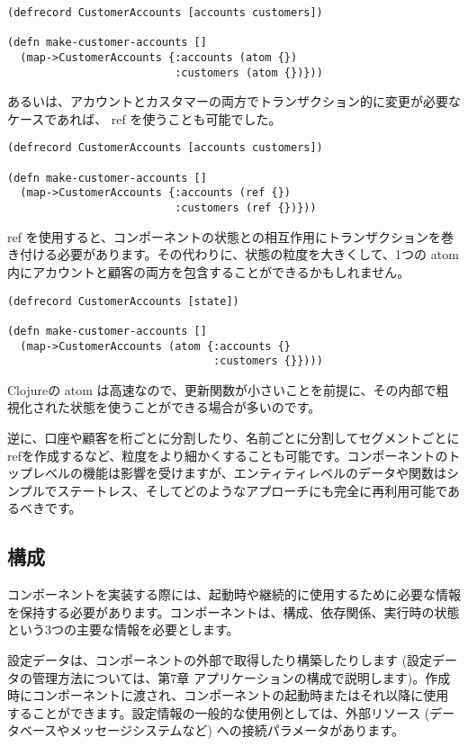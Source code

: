 \begin{lstlisting}[numbers=none]
(defrecord CustomerAccounts [accounts customers])

(defn make-customer-accounts []
  (map->CustomerAccounts {:accounts (atom {})
                          :customers (atom {})}))
\end{lstlisting}

あるいは、アカウントとカスタマーの両方でトランザクション的に変更が必要なケースであれば、 ref を使うことも可能でした。


\begin{lstlisting}[numbers=none]
(defrecord CustomerAccounts [accounts customers])

(defn make-customer-accounts []
  (map->CustomerAccounts {:accounts (ref {})
                          :customers (ref {})}))
\end{lstlisting}

ref を使用すると、コンポーネントの状態との相互作用にトランザクションを巻き付ける必要があります。その代わりに、状態の粒度を大きくして、1つの atom 内にアカウントと顧客の両方を包含することができるかもしれません。

\begin{lstlisting}[numbers=none]
(defrecord CustomerAccounts [state])

(defn make-customer-accounts []
  (map->CustomerAccounts (atom {:accounts {}
                                :customers {}})))
\end{lstlisting}

Clojureの atom は高速なので、更新関数が小さいことを前提に、その内部で粗視化された状態を使うことができる場合が多いのです。

逆に、口座や顧客を桁ごとに分割したり、名前ごとに分割してセグメントごとにrefを作成するなど、粒度をより細かくすることも可能です。コンポーネントのトップレベルの機能は影響を受けますが、エンティティレベルのデータや関数はシンプルでステートレス、そしてどのようなアプローチにも完全に再利用可能であるべきです。

\subsection{構成}

コンポーネントを実装する際には、起動時や継続的に使用するために必要な情報を保持する必要があります。コンポーネントは、構成、依存関係、実行時の状態という3つの主要な情報を必要とします。

設定データは、コンポーネントの外部で取得したり構築したりします (設定データの管理方法については、第7章 アプリケーションの構成で説明します)。作成時にコンポーネントに渡され、コンポーネントの起動時またはそれ以降に使用することができます。設定情報の一般的な使用例としては、外部リソース (データベースやメッセージシステムなど) への接続パラメータがあります。

